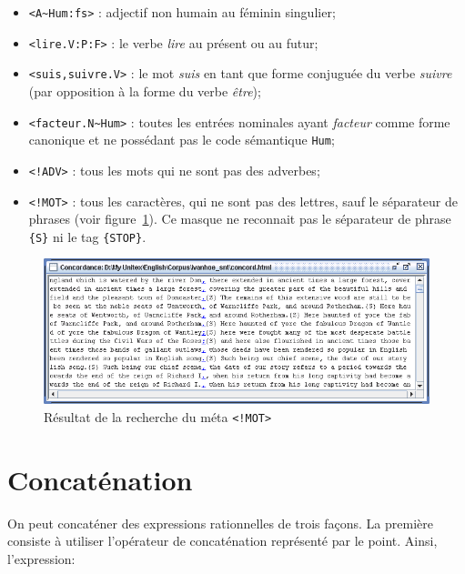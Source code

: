 \begin{itemize}
  \item \verb$<A~Hum:fs>$ : adjectif non humain au féminin singulier;
  \item \verb+<lire.V:P:F>+ : le verbe \textit{lire} au présent ou au futur;
  \item \verb$<suis,suivre.V>$ : le mot \textit{suis} en tant que forme conjuguée du verbe
  	  \textit{suivre}
  	  (par opposition à la forme du verbe \textit{être});
  \item \verb$<facteur.N~Hum>$ : toutes les entrées nominales ayant \textit{facteur} comme forme
  	  canonique et ne possédant pas le code sémantique \verb+Hum+;
  \item \verb$<!ADV>$ : tous les mots qui ne sont pas des adverbes;
  \item \verb$<!MOT>$ : tous les caractères, qui ne sont pas des lettres, sauf le séparateur de
  	  phrases
  	  (voir figure~\ref{fig-search-<!MOT>}). Ce masque ne reconnait pas le séparateur de phrase
  	  \verb+{S}+
  	  ni le tag \verb+{STOP}+.
\end{itemize}

\bigskip
\begin{figure}[h]
\begin{center}
\includegraphics[width=15cm]{resources/img/fig4-2.png}
\caption{Résultat de la recherche du méta
\texttt{<!MOT>}\label{fig-search-<!MOT>}}
\end{center}
\end{figure}

\section{Concaténation}

On peut concaténer des expressions rationnelles de trois façons. La première consiste à
utiliser l’opérateur de concaténation représenté par le point. Ainsi, l’expression:

